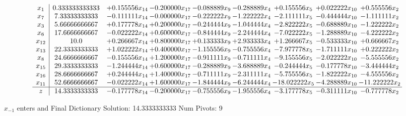 \documentclass[10pt]{article}
\begin{document}
 \[\begin{array}{c| c c@{\hskip 2pt} c@{\hskip 2pt} c@{\hskip 2pt} c@{\hskip 2pt} c@{\hskip 2pt} c@{\hskip 2pt} c@{\hskip 2pt} }
 x_{1}   &  0.333333333333 & + 0.155556 x_{14} & -0.200000 x_{17} & -0.088889 x_{9} & -0.288889 x_{4} & + 0.155556 x_{5} & + 0.022222 x_{10} & + 0.555556 x_{2}\\
 x_{7}   &  7.33333333333 & -0.111111 x_{14} & -0.000000 x_{17} & -0.222222 x_{9} & -1.222222 x_{4} & -2.111111 x_{5} & -0.444444 x_{10} & -1.111111 x_{2}\\
 x_{3}   &  5.66666666667 & + 0.177778 x_{14} & + 0.200000 x_{17} & -0.244444 x_{9} & -1.044444 x_{4} & -2.822222 x_{5} & -0.688889 x_{10} & -1.222222 x_{2}\\
 x_{6}   &  17.6666666667 & -0.022222 x_{14} & + 0.600000 x_{17} & -0.844444 x_{9} & -2.244444 x_{4} & -7.022222 x_{5} & -1.288889 x_{10} & -4.222222 x_{2}\\
 x_{12}   &  10.0 & + 0.266667 x_{14} & + 0.800000 x_{17} & + 0.133333 x_{9} & + 2.933333 x_{4} & + 1.266667 x_{5} & -0.533333 x_{10} & + 0.666667 x_{2}\\
 x_{13}   &  22.3333333333 & + 1.022222 x_{14} & + 0.400000 x_{17} & -1.155556 x_{9} & -0.755556 x_{4} & -7.977778 x_{5} & -1.711111 x_{10} & + 0.222222 x_{2}\\
 x_{8}   &  24.6666666667 & -0.155556 x_{14} & + 1.200000 x_{17} & -0.911111 x_{9} & -0.711111 x_{4} & -9.155556 x_{5} & -2.022222 x_{10} & -5.555556 x_{2}\\
 x_{15}   &  29.3333333333 & -1.244444 x_{14} & + 0.600000 x_{17} & -0.288889 x_{9} & -3.688889 x_{4} & -0.244444 x_{5} & -0.177778 x_{10} & -3.444444 x_{2}\\
 x_{16}   &  28.6666666667 & + 0.244444 x_{14} & + 1.400000 x_{17} & -0.711111 x_{9} & -2.311111 x_{4} & -5.755556 x_{5} & -1.822222 x_{10} & -4.555556 x_{2}\\
 x_{11}   &  52.6666666667 & -0.022222 x_{14} & + 1.600000 x_{17} & -1.844444 x_{9} & -6.244444 x_{4} & -18.022222 x_{5} & -4.288889 x_{10} & -11.222222 x_{2}\\
\hline
z    &  14.3333333333 & -0.177778 x_{14} & -0.200000 x_{17} & -0.755556 x_{9} & -1.955556 x_{4} & -3.177778 x_{5} & -0.311111 x_{10} & -0.777778 x_{2}\\
\end{array}\]


 $ x_{-1} $ enters and Final Dictionary
Solution:  14.3333333333
Num Pivots:  9
\end{document}
